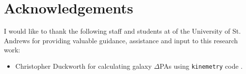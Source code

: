 \section*{Acknowledgements} %

I would like to thank the following staff and students at of the University of St. Andrews for providing valuable guidance, assistance and input to this research work:
\begin{itemize}
    \item Christopher Duckworth for calculating galaxy $\Delta$PAs using \texttt{kinemetry} code \citep{2011MNRAS.414.2923K}.
\end{itemize}
